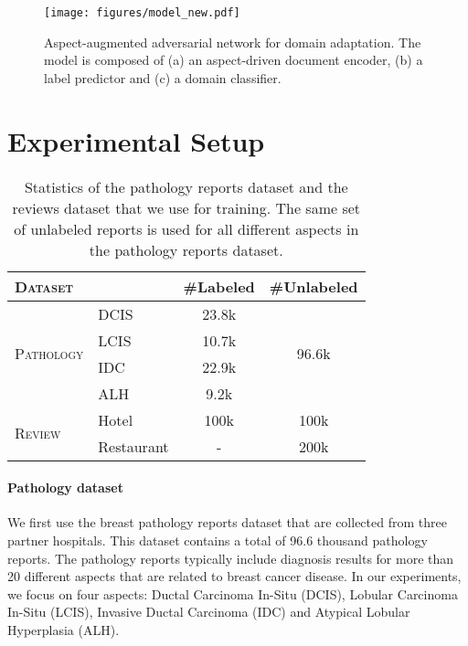 \begin{figure*}[t]
\vspace{-0.1in}
\centering
\texttt{[image: figures/model\_new.pdf]}
\caption{Aspect-augmented adversarial network for domain adaptation. The model is composed of (a) an aspect-driven document encoder, (b) a label predictor and (c) a domain classifier.
}
\label{fig:model}
\end{figure*}

\section{Experimental Setup}\label{sec:setup}

\begin{table}[t]
\begin{small}
    \centering
    \begin{tabular}{llcc}
	\toprule
    \multicolumn{2}{l}{\textsc{Dataset}} & \#Labeled & \#Unlabeled \\
    \midrule
    \multirow{4}{*}{\textsc{Pathology}} & DCIS & 23.8k & \multirow{4}{*}{96.6k} \\
     & LCIS & 10.7k &  \\
     & IDC & 22.9k &  \\
     & ALH & 9.2k &  \\
     \midrule
    \multirow{2}{*}{\textsc{Review}} & Hotel & 100k & 100k \\
     & Restaurant & - & 200k \\
    \bottomrule
    \end{tabular}
\end{small}
    \caption{Statistics of the pathology reports dataset and the reviews dataset that we use for training. The same set of unlabeled reports is used for all different aspects in the pathology reports dataset.}\label{tb:data}
\end{table}


\paragraph{Pathology dataset} 
We first use the breast pathology reports dataset that are collected from three partner hospitals. This dataset contains a total of 96.6 thousand pathology reports. The pathology reports typically include diagnosis results for more than 20 different aspects that are related to breast cancer disease. In our experiments, we focus on four aspects: Ductal Carcinoma In-Situ (DCIS), Lobular Carcinoma In-Situ (LCIS), Invasive Ductal Carcinoma (IDC) and Atypical Lobular Hyperplasia (ALH). 

